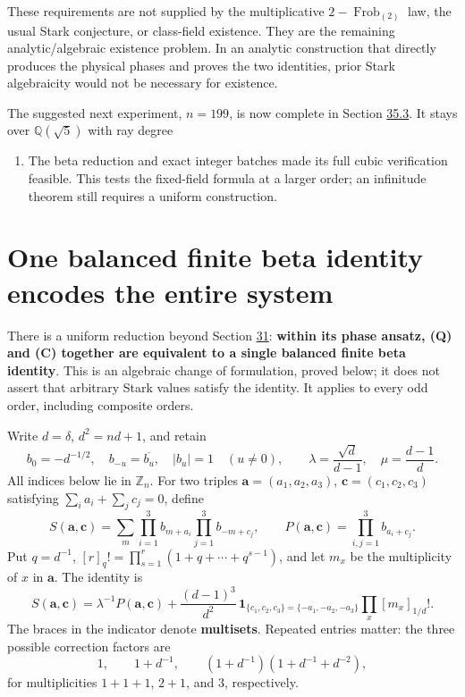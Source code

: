 \documentclass[11pt,reqno]{amsart}
\theoremstyle{plain}
\begin{document}
These requirements are not supplied by the multiplicative
\(2-\operatorname{Frob}_{(2)}\) law, the usual Stark conjecture, or
class-field existence. They are the remaining analytic/algebraic
existence problem. In an analytic construction that directly produces
the physical phases and proves the two identities, prior Stark
algebraicity would not be necessary for existence.

The suggested next experiment, \(n=199\), is now complete in
Section \hyperref[sec:35.3]{35.3}. It stays over \(\mathbb Q(\sqrt5)\) with ray degree
\begin{enumerate}
\item The beta reduction and exact integer batches made its full cubic
verification feasible. This tests the fixed-field formula at a larger
order; an infinitude theorem still requires a uniform construction.
\end{enumerate}

\section{One balanced finite beta identity encodes the entire system}\label{sec:34}

There is a uniform reduction beyond Section \hyperref[sec:31]{31}: \textbf{within its phase
ansatz, (Q) and (C) together are equivalent to a single balanced finite
beta identity}. This is an algebraic change of formulation, proved
below; it does not assert that arbitrary Stark values satisfy the identity.
It applies to every odd order, including composite orders.

Write \(d=\delta\), \(d^2=nd+1\), and retain
\[
 b_0=-d^{-1/2},\quad b_{-u}=\overline{b_u},\quad
 |b_u|=1\quad(u\ne0),\qquad
 \lambda=\frac{\sqrt d}{d-1},\quad \mu=\frac{d-1}{d}.
\]
All indices below lie in \(\mathbb Z_n\). For two triples
\(\mathbf a=(a_1,a_2,a_3)\), \(\mathbf c=(c_1,c_2,c_3)\)
satisfying \(\sum_i a_i+\sum_j c_j=0\), define
\[
 S(\mathbf a,\mathbf c)
 =\sum_m\prod_{i=1}^3 b_{m+a_i}\prod_{j=1}^3 b_{-m+c_j},
 \qquad
 P(\mathbf a,\mathbf c)=\prod_{i,j=1}^3 b_{a_i+c_j}.
\]
Put \(q=d^{-1}\), \([r]_q!=\prod_{s=1}^r(1+q+\cdots+q^{s-1})\),
and let \(m_x\) be the multiplicity of \(x\) in \(\mathbf a\).
The identity is
\begin{equation*}
 \boxed{\quad
 S(\mathbf a,\mathbf c)=\lambda^{-1}P(\mathbf a,\mathbf c)
 +\frac{(d-1)^3}{d^2}\,
  \mathbf1_{\{c_1,c_2,c_3\}=\{-a_1,-a_2,-a_3\}}
  \prod_x[m_x]_{1/d}! .\quad} \tag{34.1}
\end{equation*}
The braces in the indicator denote \textbf{multisets}. Repeated entries
matter: the three possible correction factors are
\[
 1,\qquad 1+d^{-1},\qquad
 (1+d^{-1})(1+d^{-1}+d^{-2}),
\]
for multiplicities \(1+1+1\), \(2+1\), and \(3\), respectively.
\end{document}

